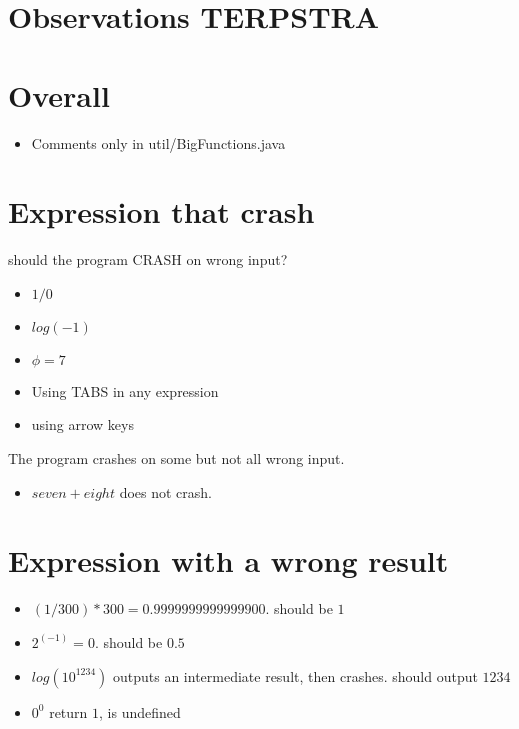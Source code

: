 \documentclass[11pt,a4paper]{article}
\begin{document}
\section{Observations TERPSTRA}
\section{Overall}
\begin{itemize}
\item Comments only in util/BigFunctions.java
\end{itemize}
\section{Expression that crash}
should the program CRASH on wrong input?
\begin{itemize}
\item \(1/0\)
\item \(log(-1)\)
\item \(\phi = 7\)
\item Using TABS in any expression
\item using arrow keys
\end{itemize}

The program crashes on some but not all wrong input.
\begin{itemize}
\item \(seven + eight\) does not crash.
\end{itemize}
\section{Expression with a wrong result}
\begin{itemize}
\item \((1 / 300) * 300 = 0.9999999999999900\). should be \(1\)
\item \(2^(-1) = 0\). should be \(0.5\)
\item \(log( 10 ^ 1234)\) outputs an intermediate result, then crashes. should output \(1234\)
\item \(0^0\) return \(1\), is undefined
\end{itemize}
\end{document}
